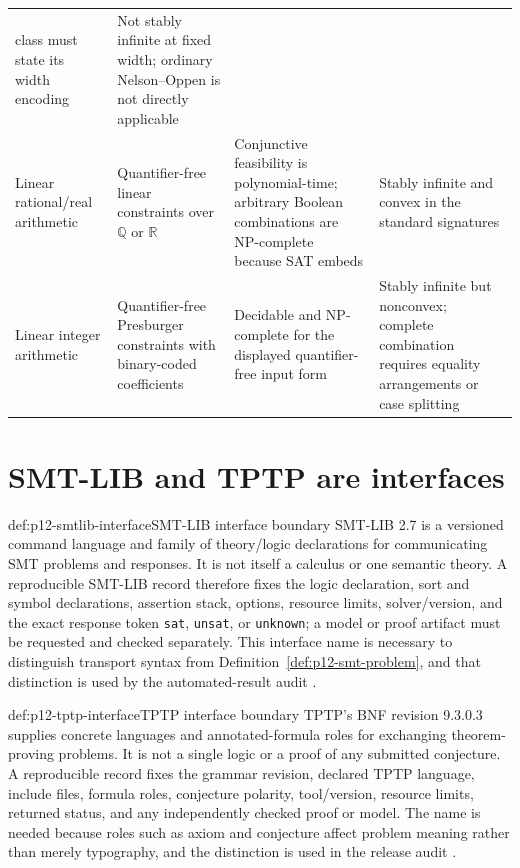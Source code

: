 \begin{landscape}
\begin{longtable}{@{}p{.95in}p{1.90in}p{2.15in}p{2.15in}@{}}
class must state its width encoding & Not stably infinite at fixed width;
ordinary Nelson--Oppen is not directly applicable \cite{SMTLIB2025} \\
\addlinespace
Linear rational/real arithmetic & Quantifier-free linear constraints over
\(\mathbb Q\) or \(\mathbb R\) & Conjunctive feasibility is polynomial-time;
arbitrary Boolean combinations are NP-complete because SAT embeds &
Stably infinite and convex in the standard signatures
\cite{DutertreDeMoura2006} \\ \addlinespace
Linear integer arithmetic & Quantifier-free Presburger constraints with
binary-coded coefficients & Decidable and NP-complete for the displayed
quantifier-free input form & Stably infinite but nonconvex; complete
combination requires equality arrangements or case splitting \\ \bottomrule
\end{longtable}
\endgroup
\end{landscape}

\section{SMT-LIB and TPTP are interfaces}

\begin{hbdefinition}{def:p12-smtlib-interface}{SMT-LIB interface boundary}
SMT-LIB 2.7 is a versioned command language and family of theory/logic
declarations for communicating SMT problems and responses.  It is not itself
a calculus or one semantic theory.  A reproducible SMT-LIB record therefore
fixes the logic declaration, sort and symbol declarations, assertion stack,
options, resource limits, solver/version, and the exact response token
\texttt{sat}, \texttt{unsat}, or \texttt{unknown}; a model or proof artifact
must be requested and checked separately.  This interface name is necessary
to distinguish transport syntax from Definition~\ref{def:p12-smt-problem},
and that distinction is used by the automated-result audit
\cite{SMTLIB2025}.
\end{hbdefinition}

\begin{hbdefinition}{def:p12-tptp-interface}{TPTP interface boundary}
TPTP's BNF revision 9.3.0.3 supplies concrete languages and annotated-formula
roles for exchanging theorem-proving problems.  It is not a single logic or a
proof of any submitted conjecture.  A reproducible record fixes the grammar
revision, declared TPTP language, include files, formula roles, conjecture polarity,
tool/version, resource limits, returned status, and any independently checked
proof or model.  The name is needed because roles such as axiom and conjecture
affect problem meaning rather than merely typography, and the distinction is
used in the release audit \cite{TPTP}.
\end{hbdefinition}

